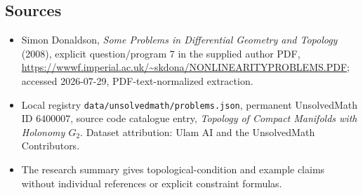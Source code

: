 \documentclass[11pt]{article}
\begin{document}
\subsection{Sources}
\begin{itemize}
\item Simon Donaldson, \emph{Some Problems in Differential Geometry and Topology} (2008), explicit question/program 7 in the supplied author PDF, \url{https://wwwf.imperial.ac.uk/~skdona/NONLINEARITYPROBLEMS.PDF}; accessed 2026-07-29, PDF-text-normalized extraction.
\item Local registry \texttt{data/unsolvedmath/problems.json}, permanent UnsolvedMath ID $6400007$, source code catalogue entry, \emph{Topology of Compact Manifolds with Holonomy $G_2$}. Dataset attribution: Ulam AI and the UnsolvedMath Contributors.
\item The research summary gives topological-condition and example claims without individual references or explicit constraint formulas.
\end{itemize}
\end{document}
